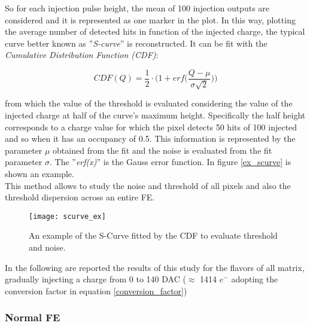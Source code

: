 So for each injection pulse height, the mean of 100 injection outputs are considered and it is represented as one marker in the plot.  In this way, plotting the average number of detected hits in function of the injected charge, the typical curve better known as ''\textit{S-curve}'' is reconstructed. It can be fit with the \textit{Cumulative Distribution Function (CDF)}:

\begin{equation}
 CDF(Q) = \frac{1}{2} \cdot \bigg(1 + \textit{erf}\bigg(\frac{Q-\mu}{\sigma \sqrt{2}}\bigg)\bigg)
\end{equation}

from which the value of the threshold is evaluated considering the value of the injected charge at half of the curve's maximum height. Specifically the half height corresponds to a charge value for which the pixel detects 50 hits of 100 injected and so when it has an occupancy of 0.5. This information is represented by the parameter $\mu$ obtained from the fit and the noise is evaluated from the fit parameter $\sigma$. The ''\textit{erf(x)}'' is the Gauss error function.  In figure \vref{ex_scurve} is shown an example. \\

This method allows to study the noise and threshold of all pixels and also the threshold dispersion across an entire FE.

\begin{comment}
 plotting the number of hits observed on each pixel divided by the total number of injections, for each injected charge,
\end{comment}



\begin{figure}
\centering
\texttt{[image: scurve\_ex]}
\caption{An example of the S-Curve fitted by the CDF to evaluate threshold and noise.}
\label{ex_scurve}
\end{figure}

In the following are reported the results of this study for the flavors of all matrix, gradually injecting a charge from 0 to 140 DAC ($\approx$ 1414 $e^{-}$ adopting the conversion factor in equation \ref{conversion_factor})



\subsubsection{Normal FE}


